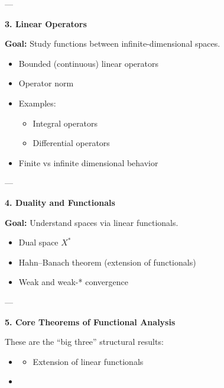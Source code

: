 \documentclass[12pt,a4paper]{report}
\begin{document}
\begin{description}
---

\item \textbf{3. Linear Operators}

\item \textbf{Goal:} Study functions between infinite-dimensional spaces.

\begin{itemize}
    \item Bounded (continuous) linear operators

    \item Operator norm

    \item Examples:

	\begin{itemize}
        \item Integral operators
        \item Differential operators
	\end{itemize}

    \item Finite vs infinite dimensional behavior
\end{itemize}

---

\item \textbf{4. Duality and Functionals}

\item \textbf{Goal:} Understand spaces via linear functionals.

\begin{itemize}
    \item Dual space $ X^* $
    \item Hahn–Banach theorem (extension of functionals)
    \item Weak and weak-* convergence
\end{itemize}

---

\item \textbf{5. Core Theorems of Functional Analysis}

These are the “big three” structural results:

\begin{itemize}
    \item {}

	\begin{itemize}
        \item Extension of linear functionals
	\end{itemize}
    \item {}


\end{itemize}
\end{description}
\end{document}
